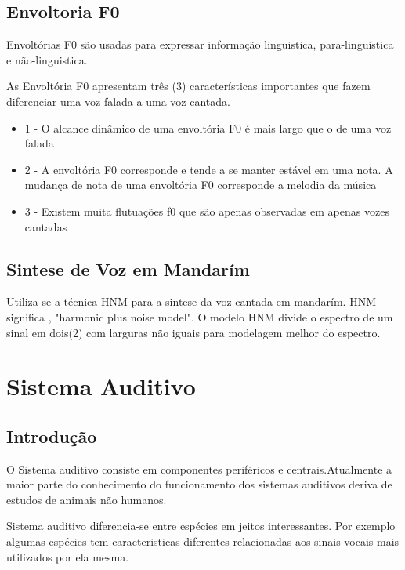 	
	\subsection{Envoltoria F0}
	
	Envoltórias F0 são usadas para expressar informação linguistica, para-linguística e não-linguistica.\cite{SaitouF0}
	\linebreak
	
	As Envoltória F0 apresentam três (3) características importantes que fazem diferenciar uma voz falada a uma voz cantada.\cite{SaitouNada}
	\linebreak
	\begin{itemize}
		\item 1 - O alcance dinâmico de uma envoltória F0 é mais largo que o de uma voz falada
		\item 2 - A envoltória F0 corresponde e tende a se manter estável em uma nota. A mudança de nota de uma envoltória F0 corresponde a melodia da música
		\item 3 - Existem muita flutuações f0 que são apenas observadas em apenas vozes cantadas
	\end{itemize}
	
	
	\subsection{Sintese de Voz em Mandarím}
		Utiliza-se a técnica HNM para a sintese da voz cantada em mandarím. HNM significa , "harmonic plus noise model".
		O modelo HNM divide o espectro de um sinal em dois(2) com larguras não iguais para modelagem melhor do espectro.\cite{LinRobos}
	

 

\section{Sistema Auditivo}
	\subsection{Introdução}
	O Sistema auditivo consiste em componentes periféricos e centrais.Atualmente a maior parte do conhecimento do funcionamento dos sistemas auditivos deriva de estudos de animais não humanos.\cite{Foundation1} 
	
	Sistema auditivo diferencia-se entre espécies em jeitos interessantes.
	Por exemplo algumas espécies tem caracteristicas diferentes relacionadas aos sinais vocais mais utilizados por ela mesma.\cite{Foundation1}
	
